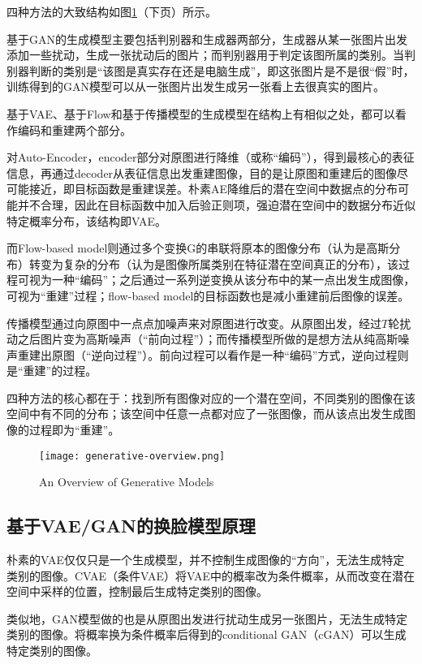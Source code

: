 \documentclass[a4paper]{article}
\begin{document}
四种方法的大致结构如图\ref{fig1}（下页）所示。

基于GAN的生成模型主要包括判别器和生成器两部分，生成器从某一张图片出发添加一些扰动，生成一张扰动后的图片；而判别器用于判定该图所属的类别。当判别器判断的类别是“该图是真实存在还是电脑生成”，即这张图片是不是很“假”时，训练得到的GAN模型可以从一张图片出发生成另一张看上去很真实的图片。

基于VAE、基于Flow和基于传播模型的生成模型在结构上有相似之处，都可以看作编码和重建两个部分。

对Auto-Encoder，encoder部分对原图进行降维（或称“编码”），得到最核心的表征信息，再通过decoder从表征信息出发重建图像，目的是让原图和重建后的图像尽可能接近，即目标函数是重建误差。朴素AE降维后的潜在空间中数据点的分布可能并不合理，因此在目标函数中加入后验正则项，强迫潜在空间中的数据分布近似特定概率分布，该结构即VAE。

而Flow-based model则通过多个变换G的串联将原本的图像分布（认为是高斯分布）转变为复杂的分布（认为是图像所属类别在特征潜在空间真正的分布），该过程可视为一种“编码”；之后通过一系列逆变换从该分布中的某一点出发生成图像，可视为“重建”过程；flow-based model的目标函数也是减小重建前后图像的误差。

传播模型通过向原图中一点点加噪声来对原图进行改变。从原图出发，经过$T$轮扰动之后图片变为高斯噪声（“前向过程”）；而传播模型所做的是想方法从纯高斯噪声重建出原图（“逆向过程”）\cite{overview}。前向过程可以看作是一种“编码”方式，逆向过程则是“重建”的过程。

四种方法的核心都在于：找到所有图像对应的一个潜在空间，不同类别的图像在该空间中有不同的分布；该空间中任意一点都对应了一张图像，而从该点出发生成图像的过程即为“重建”。

\vspace{-1em}
\begin{figure}[htb]
  \centering
  \texttt{[image: generative-overview.png]}
  \caption{An Overview of Generative Models \cite{overview}}
  \label{fig1}
\end{figure}


\subsection{基于VAE/GAN的换脸模型原理}
朴素的VAE仅仅只是一个生成模型，并不控制生成图像的“方向”，无法生成特定类别的图像。CVAE（条件VAE）将VAE中的概率改为条件概率，从而改变在潜在空间中采样的位置，控制最后生成特定类别的图像。

类似地，GAN模型做的也是从原图出发进行扰动生成另一张图片，无法生成特定类别的图像。将概率换为条件概率后得到的conditional GAN（cGAN）可以生成特定类别的图像。
\end{document}

